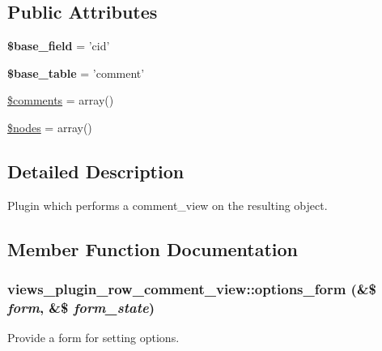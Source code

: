 \subsection*{Public Attributes}
\begin{DoxyCompactItemize}
\item 
\hypertarget{classviews__plugin__row__comment__view_a46edbf6f0286550184b7d3665e231053}{
{\bfseries \$base\_\-field} = 'cid'}
\label{classviews__plugin__row__comment__view_a46edbf6f0286550184b7d3665e231053}

\item 
\hypertarget{classviews__plugin__row__comment__view_a188aeff2a7af9aa0f518a213af10d30f}{
{\bfseries \$base\_\-table} = 'comment'}
\label{classviews__plugin__row__comment__view_a188aeff2a7af9aa0f518a213af10d30f}

\item 
\hyperlink{classviews__plugin__row__comment__view_a017d0a21f9c2877a62195ebb57f021d6}{\$comments} = array()
\item 
\hyperlink{classviews__plugin__row__comment__view_a05699b969b37f545ce6c43329f2555ec}{\$nodes} = array()
\end{DoxyCompactItemize}


\subsection{Detailed Description}
Plugin which performs a comment\_\-view on the resulting object. 

\subsection{Member Function Documentation}
\hypertarget{classviews__plugin__row__comment__view_a7dd276ec1a14a2d34f80a8020557608a}{
\subsubsection[{options\_\-form}]{\setlength{\rightskip}{0pt plus 5cm}views\_\-plugin\_\-row\_\-comment\_\-view::options\_\-form (\&\$ {\em form}, \/  \&\$ {\em form\_\-state})}}
\label{classviews__plugin__row__comment__view_a7dd276ec1a14a2d34f80a8020557608a}
Provide a form for setting options. 

